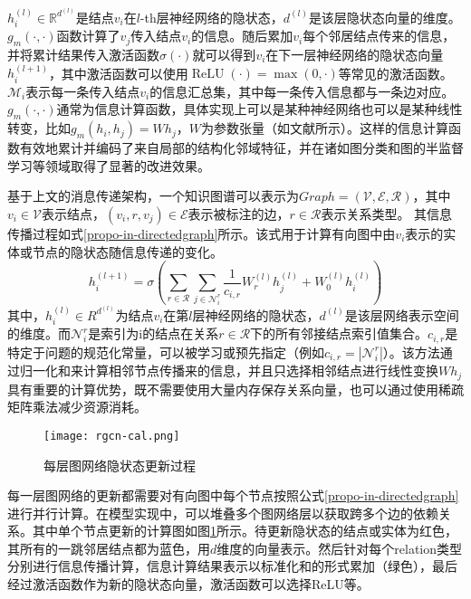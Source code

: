 $h_{i}^{(l)} \in \mathbb{R}^{d^{(l)}}$是结点$v_{i}$在$l$-th层神经网络的隐状态，$d^{(l)}$是该层隐状态向量的维度。$g_{m}(\cdot, \cdot)$函数计算了$v_{j}$传入结点$v_{i}$的信息。随后累加$v_{i}$每个邻居结点传来的信息，并将累计结果传入激活函数$\sigma(\cdot)$就可以得到$v_{i}$在下一层神经网络的隐状态向量$h_{i}^{(l+1)}$，其中激活函数可以使用$\operatorname{ReLU}(\cdot)=\max (0, \cdot)$等常见的激活函数。$\mathcal{M}_{i}$表示每一条传入结点$v_{i}$的信息汇总集，其中每一条传入信息都与一条边对应。$g_{m}(\cdot, \cdot)$通常为信息计算函数，具体实现上可以是某种神经网络也可以是某种线性转变，比如$g_{m}\left(h_{i}, h_{j}\right)=W h_{j}$，$W$为参数张量（如文献\parencite{kipf2016semi}所示）。这样的信息计算函数有效地累计并编码了来自局部的结构化邻域特征，并在诸如图分类\cite{duvenaud2015convolutional}和图的半监督学习等领域取得了显著的改进效果。

基于上文的消息传递架构，一个知识图谱可以表示为$Graph=\left(\mathcal{V},\mathcal{E},\mathcal{R}\right)$，其中$v_i\in\mathcal{V}$表示结点，$\left(v_i,r,v_j\right)\in\mathcal{E}$表示被标注的边，$r\in\mathcal{R}$表示关系类型。
其信息传播过程如式\ref{propo-in-directedgraph}所示。该式用于计算有向图中由$v_{i}$表示的实体或节点的隐状态随信息传递的变化。
\begin{equation}
    h_{i}^{(l+1)}=\sigma\left(\sum_{r \in \mathcal{R}} \sum_{j \in \mathcal{N}_{i}^{r}} \frac{1}{c_{i, r}} W_{r}^{(l)} h_{j}^{(l)}+W_{0}^{(l)} h_{i}^{(l)}\right)
    \label{propo-in-directedgraph}
\end{equation}
其中，$h_i^{\left(l\right)}\in R^{d^{\left(l\right)}}$为结点$v_i$在第$l$层神经网络的隐状态，$d^{\left(l\right)}$是该层网络表示空间的维度。而$\mathcal{N}_{i}^{r}$是索引为i的结点在关系$r\in\mathcal{R}$下的所有邻接结点索引值集合。$c_{i,r}$是特定于问题的规范化常量，可以被学习或预先指定（例如$c_{i, r}=\left|\mathcal{N}_{i}^{r}\right|$）。该方法通过归一化和来计算相邻节点传播来的信息，并且只选择相邻结点进行线性变换$Wh_j$具有重要的计算优势，既不需要使用大量内存保存关系向量，也可以通过使用稀疏矩阵乘法减少资源消耗。

\begin{figure}[htbp]
    \centering
    \texttt{[image: rgcn-cal.png]}
    \caption{每层图网络隐状态更新过程\label{rgcn-cal}}
\end{figure}

每一层图网络的更新都需要对有向图中每个节点按照公式\ref{propo-in-directedgraph}进行并行计算。在模型实现中，可以堆叠多个图网络层以获取跨多个边的依赖关系。其中单个节点更新的计算图如图\ref{rgcn-cal}所示。待更新隐状态的结点或实体为红色，其所有的一跳邻居结点都为蓝色，用$d$维度的向量表示。然后针对每个relation类型分别进行信息传播计算，信息计算结果表示以标准化和的形式累加（绿色），最后经过激活函数作为新的隐状态向量，激活函数可以选择ReLU等。

